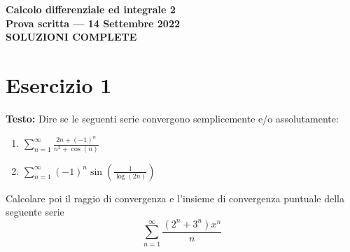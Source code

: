\documentclass[12pt, a4paper]{article}
\begin{document}
\begin{center}
\Large\textbf{Calcolo differenziale ed integrale 2}\\
\large\textbf{Prova scritta --- 14 Settembre 2022}\\
\large\textbf{SOLUZIONI COMPLETE}
\end{center}

\vspace{1cm}

\section*{Esercizio 1}

\textbf{Testo:} Dire se le seguenti serie convergono semplicemente e/o assolutamente:
\begin{enumerate}
    \item $\displaystyle\sum_{n=1}^{\infty} \frac{2n+(-1)^{n}}{n^{2}+\cos(n)}$
    \item $\displaystyle\sum_{n=1}^{\infty} (-1)^{n} \sin\left(\frac{1}{\log(2n)}\right)$
\end{enumerate}
Calcolare poi il raggio di convergenza e l'insieme di convergenza puntuale della seguente serie
\[ \sum_{n=1}^{\infty} \frac{(2^{n}+3^{n})x^{n}}{n} \]
\end{document}
